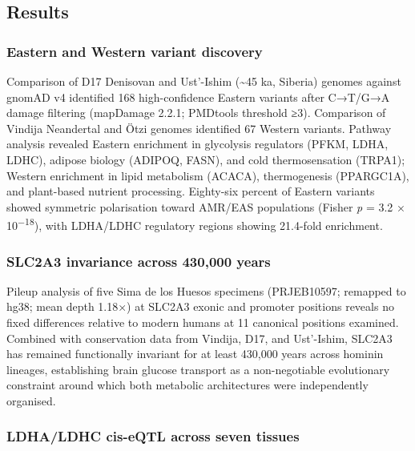 \documentclass[
  letterpaper,
  DIV=11,
  numbers=noendperiod]{scrartcl}
\begin{document}
\subsection{Results}\label{results}

\subsubsection{Eastern and Western variant
discovery}\label{eastern-and-western-variant-discovery}

Comparison of D17 Denisovan and Ust'-Ishim (\textasciitilde45 ka,
Siberia) genomes against gnomAD v4 identified 168 high-confidence
Eastern variants after C→T/G→A damage filtering (mapDamage 2.2.1;
PMDtools threshold ≥3). Comparison of Vindija Neandertal and Ötzi
genomes identified 67 Western variants. Pathway analysis revealed
Eastern enrichment in glycolysis regulators (PFKM, LDHA, LDHC), adipose
biology (ADIPOQ, FASN), and cold thermosensation (TRPA1); Western
enrichment in lipid metabolism (ACACA), thermogenesis (PPARGC1A), and
plant-based nutrient processing. Eighty-six percent of Eastern variants
showed symmetric polarisation toward AMR/EAS populations (Fisher
\emph{p} = 3.2 × 10\textsuperscript{−18}), with LDHA/LDHC regulatory
regions showing 21.4-fold enrichment.

\subsubsection{SLC2A3 invariance across 430,000
years}\label{slc2a3-invariance-across-430000-years}

Pileup analysis of five Sima de los Huesos specimens (PRJEB10597;
remapped to hg38; mean depth 1.18×) at SLC2A3 exonic and promoter
positions reveals no fixed differences relative to modern humans at 11
canonical positions examined. Combined with conservation data from
Vindija, D17, and Ust'-Ishim, SLC2A3 has remained functionally invariant
for at least 430,000 years across hominin lineages, establishing brain
glucose transport as a non-negotiable evolutionary constraint around
which both metabolic architectures were independently organised.

\subsubsection{LDHA/LDHC cis-eQTL across seven
tissues}\label{ldhaldhc-trans-eqtl-across-seven-tissues}
\end{document}
